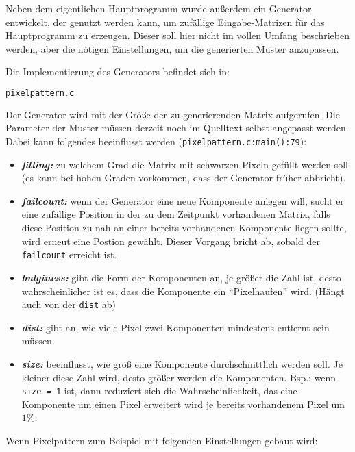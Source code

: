 \label{pixelpattern}

Neben dem eigentlichen Hauptprogramm wurde außerdem ein Generator entwickelt, der genutzt werden kann, um zufällige Eingabe-Matrizen für das Hauptprogramm zu erzeugen. Dieser soll hier nicht im vollen Umfang beschrieben werden, aber die nötigen Einstellungen, um die generierten Muster anzupassen.

Die Implementierung des Generators befindet sich in:

\begin{lstlisting}[language=C, aboveskip=\baselineskip, basicstyle=\footnotesize\ttfamily, lineskip=0pt]
pixelpattern.c
\end{lstlisting}

Der Generator wird mit der Größe der zu generierenden Matrix aufgerufen. Die Parameter der Muster müssen derzeit noch im Quelltext selbst angepasst werden. Dabei kann folgendes beeinflusst werden (\verb+pixelpattern.c:main():79+):

\begin{itemize}
	\item \textsl{\textbf{filling:}} zu welchem Grad die Matrix mit schwarzen Pixeln gefüllt werden soll (es kann bei hohen Graden vorkommen, dass der Generator früher abbricht).
	\item \textsl{\textbf{failcount:}} wenn der Generator eine neue Komponente anlegen will, sucht er eine zufällige Position in der zu dem Zeitpunkt vorhandenen Matrix, falls diese Position zu nah an einer bereits vorhandenen Komponente liegen sollte, wird erneut eine Postion gewählt. Dieser Vorgang bricht ab, sobald der \verb+failcount+ erreicht ist.
	\item \textsl{\textbf{bulginess:}} gibt die Form der Komponenten an, je größer die Zahl ist, desto wahrscheinlicher ist es, dass die Komponente ein "`Pixelhaufen"' wird. (Hängt auch von der \verb+dist+ ab)
	\item \textsl{\textbf{dist:}} gibt an, wie viele Pixel zwei Komponenten mindestens entfernt sein müssen.
	\item \textsl{\textbf{size:}} beeinflusst, wie groß eine Komponente durchschnittlich werden soll. Je kleiner diese Zahl wird, desto größer werden die Komponenten. Bsp.: wenn \verb+size = 1+ ist, dann reduziert sich die Wahrscheinlichkeit, das eine Komponente um einen Pixel erweitert wird je bereits vorhandenem Pixel um $1\%$.
\end{itemize}

Wenn Pixelpattern zum Beispiel mit folgenden Einstellungen gebaut wird:

